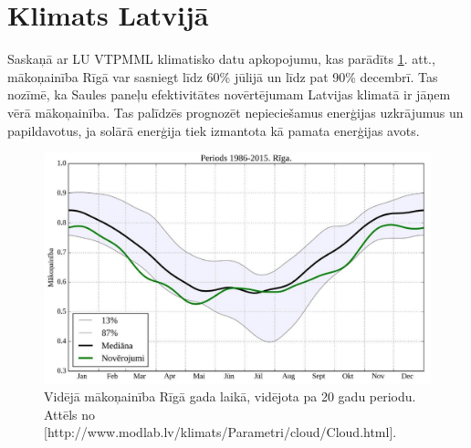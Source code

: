\section{Klimats Latvijā}

Saskaņā ar LU VTPMML klimatisko datu apkopojumu, kas parādīts \ref{fig:makoni_Riga}. att., mākoņainība Rīgā var sasniegt līdz 60\% jūlijā un līdz pat 90\% decembrī. Tas nozīmē, ka Saules paneļu efektivitātes novērtējumam Latvijas klimatā ir jāņem vērā mākoņainība. Tas palīdzēs prognozēt nepieciešamus enerģijas uzkrājumus un papildavotus, ja solārā enerģija tiek izmantota kā pamata enerģijas avots.
\begin{figure}[h]
	\centering
	\includegraphics[width=0.8\linewidth]{figures/misc/makoni_riga.jpg}
	\caption{Vidējā mākoņainība Rīgā gada laikā, vidējota pa 20 gadu periodu. Attēls no [http://www.modlab.lv/klimats/Parametri/cloud/Cloud.html].}
	\label{fig:makoni_Riga}
\end{figure}

